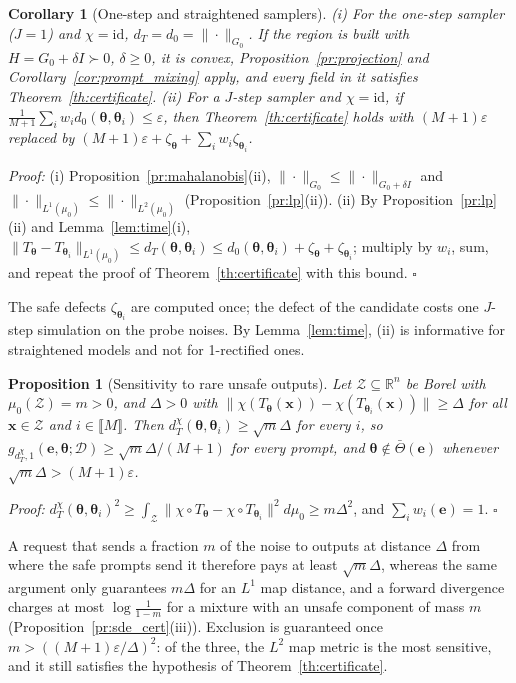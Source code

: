 \documentclass{article}
\newcommand{\RR}{\mathbb{R}}
\newcommand{\cD}{\mathcal{D}}
\newcommand{\bth}{\boldsymbol{\theta}}
\newcommand{\bx}{\mathbf{x}}
\newcommand{\be}{\mathbf{e}}
\newcommand{\Tbar}{\bar{\Theta}}
\theoremstyle{plain}
\newtheorem{proposition}[theorem]{Proposition}
\newtheorem{corollary}[theorem]{Corollary}
\theoremstyle{remark}
\begin{document}
\begin{corollary}[One-step and straightened samplers]\label{cor:one_step}
(i) For the one-step sampler ($J=1$) and $\chi=\mathrm{id}$, $d_T=d_0=\|\cdot\|_{G_0}$. If the region is built with
$H=G_0+\delta I\succ0$, $\delta\ge0$, it is convex, Proposition~\ref{pr:projection} and
Corollary~\ref{cor:prompt_mixing} apply, and every field in it satisfies Theorem~\ref{th:certificate}.
(ii) For a $J$-step sampler and $\chi=\mathrm{id}$, if $\frac{1}{M+1}\sum_iw_id_0(\bth,\bth_i)\le\varepsilon$, then
Theorem~\ref{th:certificate} holds with $(M+1)\varepsilon$ replaced by
$(M+1)\varepsilon+\zeta_{\bth}+\sum_iw_i\zeta_{\bth_i}$.
\end{corollary}
\textit{Proof:}
(i) Proposition~\ref{pr:mahalanobis}(ii), $\|\cdot\|_{G_0}\le\|\cdot\|_{G_0+\delta I}$ and
$\|\cdot\|_{L^1(\mu_0)}\le\|\cdot\|_{L^2(\mu_0)}$ (Proposition~\ref{pr:lp}(ii)). (ii) By Proposition~\ref{pr:lp}(ii) and Lemma~\ref{lem:time}(i),
$\|T_{\bth}-T_{\bth_i}\|_{L^1(\mu_0)}\le d_T(\bth,\bth_i)\le d_0(\bth,\bth_i)+\zeta_{\bth}+\zeta_{\bth_i}$; multiply by $w_i$, sum, and
repeat the proof of Theorem~\ref{th:certificate} with this bound. \hfill$\square$

The safe defects $\zeta_{\bth_i}$ are computed once; the defect of the candidate costs one $J$-step
simulation on the probe noises. By Lemma~\ref{lem:time}, (ii) is informative for straightened
models and not for 1-rectified ones.

\begin{proposition}[Sensitivity to rare unsafe outputs]\label{pr:sqrt_m}
Let $\mathcal Z\subseteq\RR^n$ be Borel with $\mu_0(\mathcal Z)=m>0$, and $\Delta>0$ with
$\|\chi(T_{\bth}(\bx))-\chi(T_{\bth_i}(\bx))\|\ge\Delta$ for all $\bx\in\mathcal Z$ and $i\in\llbracket M\rrbracket$. Then
$d^\chi_T(\bth,\bth_i)\ge\sqrt m\Delta$ for every $i$, so $g_{d^\chi_T,1}(\be,\bth;\cD)\ge\sqrt m\Delta/(M+1)$ for every
prompt, and $\bth\notin\Tbar(\be)$ whenever $\sqrt m\Delta>(M+1)\varepsilon$.
\end{proposition}
\textit{Proof:}
$d^\chi_T(\bth,\bth_i)^2\ge\int_{\mathcal Z}\|\chi\circ T_{\bth}-\chi\circ T_{\bth_i}\|^2d\mu_0\ge m\Delta^2$, and $\sum_iw_i(\be)=1$.
\hfill$\square$

A request that sends a fraction $m$ of the noise to outputs at distance $\Delta$ from where the safe
prompts send it therefore pays at least $\sqrt m\Delta$, whereas the same argument only guarantees $m\Delta$ for an $L^1$ map
distance, and a forward divergence charges at most $\log\frac{1}{1-m}$ for a mixture with an unsafe
component of mass $m$ (Proposition~\ref{pr:sde_cert}(iii)). Exclusion is guaranteed once
$m>((M+1)\varepsilon/\Delta)^2$: of the three, the $L^2$ map metric is the most sensitive, and it still
satisfies the hypothesis of Theorem~\ref{th:certificate}.
\end{document}
